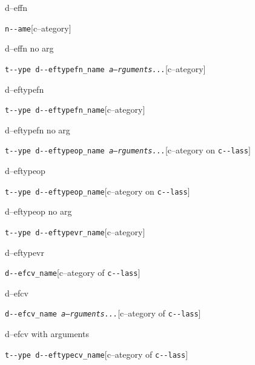 \documentclass{book}
\begin{document}
%
d--effn

\noindent\texttt{n{-}{-}ame}\hfill[c--ategory]



%
d--effn no arg

\noindent\texttt{t{-}{-}ype d{-}{-}eftypefn\_name \bgroup{}\normalfont{}\textsl{a--rguments...}\egroup{}}\hfill[c--ategory]



%
d--eftypefn

\noindent\texttt{t{-}{-}ype d{-}{-}eftypefn\_name}\hfill[c--ategory]



%
d--eftypefn no arg

\noindent\texttt{t{-}{-}ype d{-}{-}eftypeop\_name \bgroup{}\normalfont{}\textsl{a--rguments...}\egroup{}}\hfill[c--ategory on \texttt{c{-}{-}lass}]



%
d--eftypeop

\noindent\texttt{t{-}{-}ype d{-}{-}eftypeop\_name}\hfill[c--ategory on \texttt{c{-}{-}lass}]



%
d--eftypeop no arg

\noindent\texttt{t{-}{-}ype d{-}{-}eftypevr\_name}\hfill[c--ategory]



%
d--eftypevr

\noindent\texttt{d{-}{-}efcv\_name}\hfill[c--ategory of \texttt{c{-}{-}lass}]



%
d--efcv

\noindent\texttt{d{-}{-}efcv\_name \bgroup{}\normalfont{}\textsl{a--rguments...}\egroup{}}\hfill[c--ategory of \texttt{c{-}{-}lass}]



%
d--efcv with arguments

\noindent\texttt{t{-}{-}ype d{-}{-}eftypecv\_name}\hfill[c--ategory of \texttt{c{-}{-}lass}]
\end{document}
